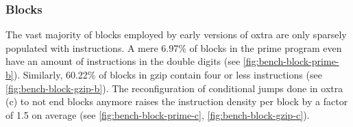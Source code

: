 \subsubsection{Blocks}
The vast majority of blocks employed by early versions of oxtra are only sparsely populated with instructions. A mere 6.97\% of blocks in the prime program even have an amount of instructions in the double digits (see \autoref{fig:bench-block-prime-b}). Similarly, 60.22\% of blocks in gzip contain four or less instructions (see \autoref{fig:bench-block-gzip-b}). The reconfiguration of conditional jumps done in oxtra (c) to not end blocks anymore raises the instruction density per block by a factor of 1.5 on average (see \autoref{fig:bench-block-prime-c}, \autoref{fig:bench-block-gzip-c}).

